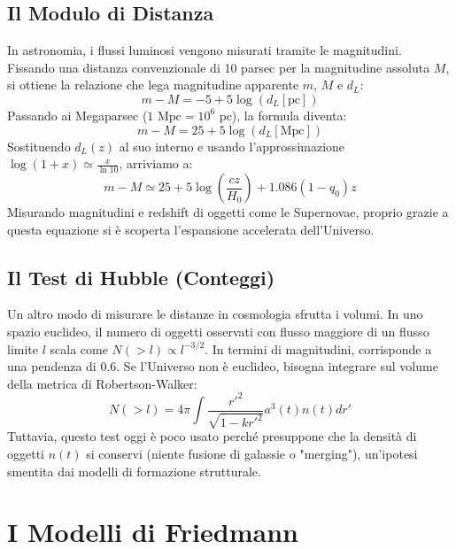 \documentclass[11pt,a4paper]{report}
\begin{document}
\subsection{Il Modulo di Distanza}
In astronomia, i flussi luminosi vengono misurati tramite le magnitudini. Fissando una distanza convenzionale di 10 parsec per la magnitudine assoluta $M$, si ottiene la relazione che lega magnitudine apparente $m$, $M$ e $d_L$:
\begin{equation}
m - M = -5 + 5 \log(d_L [\text{pc}])
\end{equation}
Passando ai Megaparsec ($1 \text{ Mpc} = 10^6 \text{ pc}$), la formula diventa:
\begin{equation}
m - M = 25 + 5 \log(d_L [\text{Mpc}])
\end{equation}
Sostituendo $d_L(z)$ al suo interno e usando l'approssimazione $\log(1+x) \simeq \frac{x}{\ln 10}$, arriviamo a:
\begin{equation}
m - M \simeq 25 + 5 \log \left(\frac{cz}{H_0}\right) + 1.086 (1-q_0)z
\end{equation}
Misurando magnitudini e redshift di oggetti come le Supernovae, proprio grazie a questa equazione si è scoperta l'espansione accelerata dell'Universo.

\subsection{Il Test di Hubble (Conteggi)}
Un altro modo di misurare le distanze in cosmologia sfrutta i volumi. In uno spazio euclideo, il numero di oggetti osservati con flusso maggiore di un flusso limite $l$ scala come $N(>l) \propto l^{-3/2}$. In termini di magnitudini, corrisponde a una pendenza di $0.6$. Se l'Universo non è euclideo, bisogna integrare sul volume della metrica di Robertson-Walker:
\begin{equation}
N(>l) = 4\pi \int \frac{r'^2}{\sqrt{1-kr'^2}} a^3(t) n(t) dr'
\end{equation}
Tuttavia, questo test oggi è poco usato perché presuppone che la densità di oggetti $n(t)$ si conservi (niente fusione di galassie o "merging"), un'ipotesi smentita dai modelli di formazione strutturale.

\section{I Modelli di Friedmann}
\end{document}
